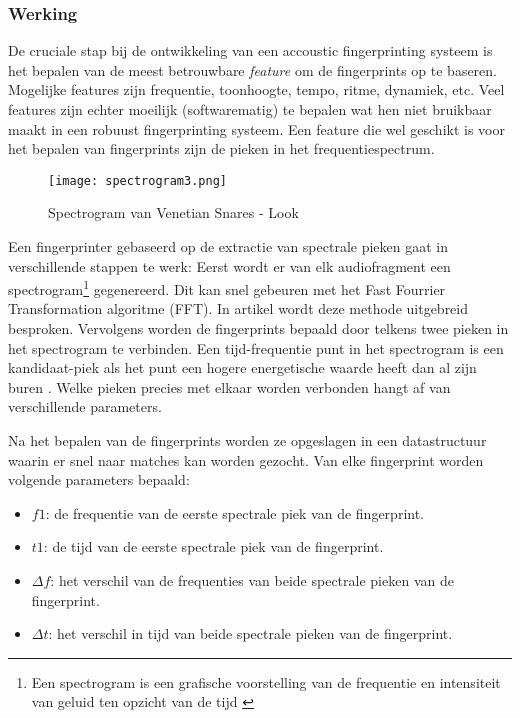\subsubsection{Werking}

De cruciale stap bij de ontwikkeling van een accoustic fingerprinting systeem is het bepalen van de meest betrouwbare \textit{feature} om de fingerprints op te baseren. Mogelijke features zijn frequentie, toonhoogte, tempo, ritme, dynamiek, etc. Veel features zijn echter moeilijk (softwarematig) te bepalen wat hen niet bruikbaar maakt in een robuust fingerprinting systeem. Een feature die wel geschikt is voor het bepalen van fingerprints zijn de pieken in het frequentiespectrum.

\begin{figure}[!h]
	\caption[Voorbeeld van een spectrogram]{Spectrogram van Venetian Snares - Look}
	\centering
	\texttt{[image: spectrogram3.png]}
\end{figure}

Een fingerprinter gebaseerd op de extractie van spectrale pieken gaat in verschillende stappen te werk: 
Eerst wordt er van elk audiofragment een spectrogram\footnote{Een spectrogram is een grafische voorstelling van de frequentie en intensiteit van geluid ten opzicht van de tijd \cite{spectrogram_dict}} gegenereerd. Dit kan snel gebeuren met het Fast Fourrier Transformation algoritme (FFT). In artikel \cite{oppenheim1970speech} wordt deze methode uitgebreid besproken. Vervolgens worden de fingerprints bepaald door telkens twee pieken in het spectrogram te verbinden. Een tijd-frequentie punt in het spectrogram is een kandidaat-piek als het punt een hogere energetische waarde heeft dan al zijn buren \cite{Wang2003a}. Welke pieken precies met elkaar worden verbonden hangt af van verschillende parameters.

Na het bepalen van de fingerprints worden ze opgeslagen in een datastructuur waarin er snel naar matches kan worden gezocht.
Van elke fingerprint worden volgende parameters bepaald:
\begin{itemize}[noitemsep]
	\item $ f1 $: de frequentie van de eerste spectrale piek van de fingerprint.
	\item $ t1 $: de tijd van de eerste spectrale piek van de fingerprint.
	\item $ \Delta f $: het verschil van de frequenties van beide spectrale pieken van de fingerprint.
	\item $ \Delta t $: het verschil in tijd van beide spectrale pieken van de fingerprint.
\end{itemize}

